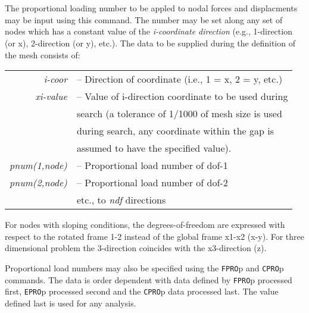  \\{\smallskip}
 \\{\smallskip}
\headb

The proportional loading number to be appled to nodal forces and displacments
may be input using this command.
The number may be set along
any set of nodes which has a constant value of the {\it i-coordinate
direction} (e.g., 1-direction (or x), 2-direction
(or  y),  etc.).  The data to be supplied during the definition of
the mesh consists of:

\begin{center}
\begin{tabular}{r l}
\it i-coor   &-- Direction of coordinate (i.e., 1 = x, 2 = y, etc.) \\
\it xi-value &-- Value of i-direction coordinate to be used during  \\
             &\quad search (a tolerance of 1/1000 of mesh size is used  \\
             &\quad during search, any coordinate within the gap is  \\
             &\quad assumed to have the specified value).  \\
\it pnum(1,node) &-- Proportional load number of dof-1 \\
\it pnum(2,node) &-- Proportional load number of dof-2 \\
                 &\quad etc., to {\it ndf} directions \\
\end{tabular}
\end{center}
For nodes with sloping conditions, the degrees-of-freedom
are expressed with respect to the rotated frame 1-2 instead
of the global frame x1-x2 (x-y).  For three dimensional problem
the 3-direction coincides with the x3-direction (z).

Proportional load numbers may also be specified using the {\tt FPRO}p
and {\tt CPRO}p commands.  The data is order dependent with data
defined by {\tt FPRO}p processed first, {\tt EPRO}p processed second and
the {\tt CPRO}p data processed last.  The value defined last is used for
any analysis.
\vfil\eject
